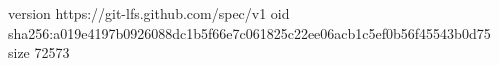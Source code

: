 version https://git-lfs.github.com/spec/v1
oid sha256:a019e4197b0926088dc1b5f66e7c061825c22ee06acb1c5ef0b56f45543b0d75
size 72573
